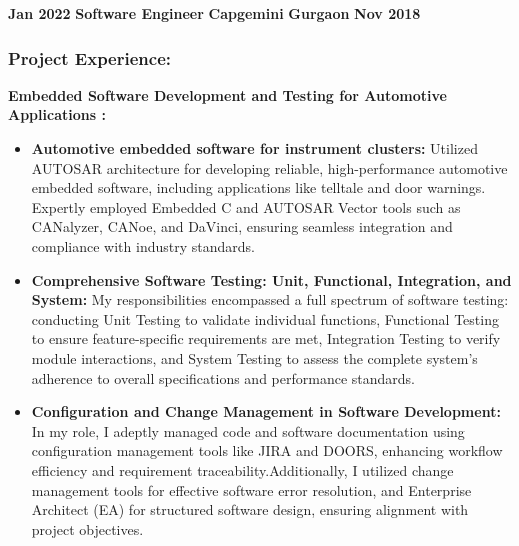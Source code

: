 \begin{experiences}
{\begin{itemize}
            \end{itemize}
        }
        {}
    \experience
        {\textbf{Jan 2022}}   %
        {\textbf{Software Engineer}}  %
        {\textbf{Capgemini}}  %
        {\textbf{Gurgaon}}  %
        {   %
            \textbf{Nov 2018}  %
        }
        {   %
            \subsubsection*{\textbf{Project Experience:}}
            \textbf{Embedded Software Development and Testing for Automotive Applications :}
            \begin{itemize}
                \item \textbf{Automotive embedded software for instrument clusters:} Utilized AUTOSAR architecture for developing reliable, high-performance automotive embedded software, including applications like telltale and door warnings. Expertly employed Embedded C and AUTOSAR Vector tools such as CANalyzer, CANoe, and DaVinci, ensuring seamless integration and compliance with industry standards.
                \item \textbf{Comprehensive Software Testing: Unit, Functional, Integration, and System:} My responsibilities encompassed a full spectrum of software testing: conducting Unit Testing to validate individual functions, Functional Testing to ensure feature-specific requirements are met, Integration Testing to verify module interactions, and System Testing to assess the complete system's adherence to overall specifications and performance standards.
                \item \textbf{Configuration and Change Management in Software Development:} In my role, I adeptly managed code and software documentation using configuration management tools like JIRA and DOORS, enhancing workflow efficiency and requirement traceability.Additionally, I utilized change management tools for effective software error resolution, and Enterprise Architect (EA) for structured software design, ensuring alignment with project objectives.
            \end{itemize}    
            
}
\end{experiences}
